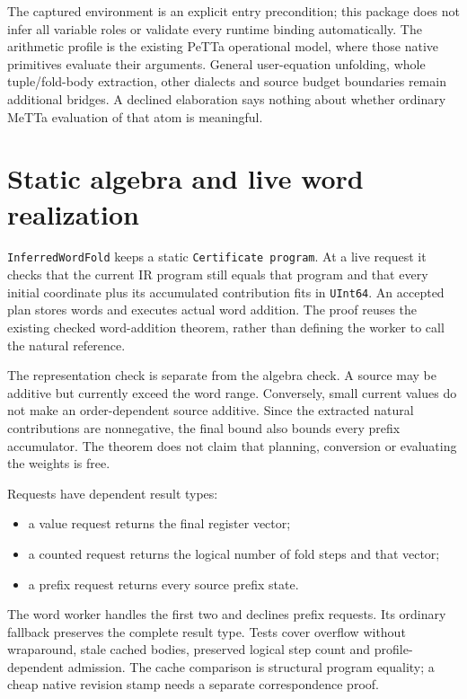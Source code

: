 \documentclass[11pt,a4paper]{article}
\newcommand{\code}[1]{\nolinkurl{#1}}
\begin{document}
The captured environment is an explicit entry precondition; this package does
not infer all variable roles or validate every runtime binding automatically.
The arithmetic profile is the existing PeTTa operational model, where those
native primitives evaluate their arguments. General user-equation unfolding,
whole tuple/fold-body extraction, other dialects and source budget boundaries
remain additional bridges. A declined elaboration says nothing about whether
ordinary MeTTa evaluation of that atom is meaningful.

\section{Static algebra and live word realization}

\code{InferredWordFold} keeps a static \code{Certificate program}. At a live
request it checks that the current IR program still equals that program and
that every initial coordinate plus its accumulated contribution fits in
\code{UInt64}. An accepted plan stores words and executes actual word addition.
The proof reuses the existing checked word-addition theorem, rather than
defining the worker to call the natural reference.

The representation check is separate from the algebra check. A source may be
additive but currently exceed the word range. Conversely, small current values
do not make an order-dependent source additive. Since the extracted natural
contributions are nonnegative, the final bound also bounds every prefix
accumulator. The theorem does not claim that planning, conversion or evaluating
the weights is free.

Requests have dependent result types:
\begin{itemize}
\item a value request returns the final register vector;
\item a counted request returns the logical number of fold steps and that vector;
\item a prefix request returns every source prefix state.
\end{itemize}
The word worker handles the first two and declines prefix requests. Its
ordinary fallback preserves the complete result type. Tests cover overflow
without wraparound, stale cached bodies, preserved logical step count and
profile-dependent admission. The cache comparison is structural program
equality; a cheap native revision stamp needs a separate correspondence proof.
\end{document}
